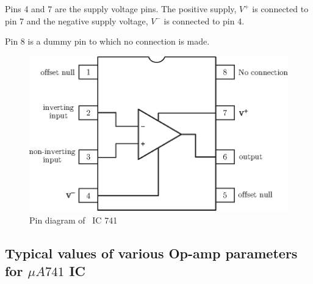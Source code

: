\vfill\eject

Pins 4 and 7 are the supply voltage pins. The positive supply, $V^{+}$ is connected to pin 7 and the negative supply voltage, $V^{-}$ is connected to pin 4.

Pin 8 is a dummy pin to which no connection is made.
\begin{figure}[H]
\centering
\includegraphics[scale=.9]{chap4/S3-EE-06-003.eps}
\caption{Pin diagram of \ IC 741}\label{fig5.3}
\end{figure}

\subsection[Typical values of various Op-amp parameters for $\mu A741$ IC]{Typical values of various Op-amp parameters for \boldmath$\mu A741$ IC}\label{sec5.1.6}

